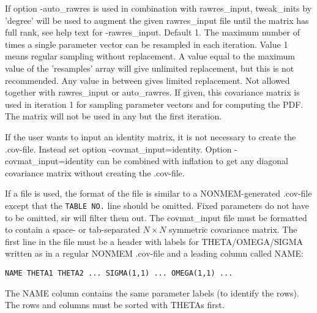 \begin{optionlist}
If option -auto\_rawres is used
in combination with rawres\_input, tweak\_inits by 'degree' will be used 
to augment the given rawres\_input file until the matrix has full rank, see help text for -rawres\_input.
\nextopt
\nextopt
{}
Default 1. The maximum number of times a single parameter vector can be resampled in each iteration. 
Value 1 means regular sampling without replacement. 
A value equal to the maximum value of the 'resamples' array will give
unlimited replacement, but this is not recommended. Any value in between gives limited replacement. 
\nextopt
{}
Not allowed together with rawres\_input or auto\_rawres. If given, this covariance matrix is
used in iteration 1
for sampling parameter vectors and for computing the PDF.
The matrix will not be used in any but the first iteration. 

If the user wants to input an identity matrix, it is not necessary to create the .cov-file.
Instead set option -covmat\_input=identity. Option -covmat\_input=identity can be combined
with inflation to get any diagonal covariance matrix without creating the .cov-file.

If a file is used, the format of the file is similar to a NONMEM-generated .cov-file except 
that the \verb|TABLE NO.| line should be omitted.
Fixed parameters do not have to be omitted, sir will filter them out. 
The covmat\_input file must be formatted to contain a space- or tab-separated  $N\times N$ symmetric covariance matrix.
The first line in the file must be a header with labels for THETA/OMEGA/SIGMA written as in a regular NONMEM .cov-file 
and a leading column called NAME: 
\begin{verbatim}
NAME THETA1 THETA2 ... SIGMA(1,1) ... OMEGA(1,1) ... 
\end{verbatim}
The NAME column contains the same parameter labels (to identify the rows).
The rows and columns must be sorted with THETAs first.


\end{optionlist}
